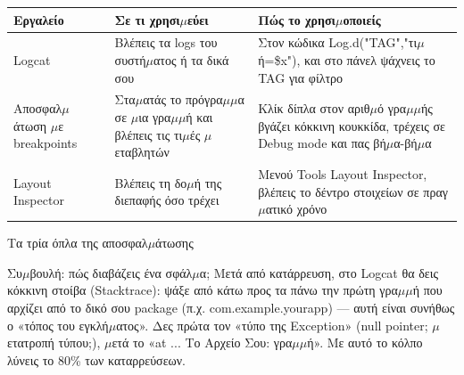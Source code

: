 


\begin{center}
\begin{tabularx}{\linewidth}{|X|X|X|}
\hline
\textbf{Εργαλείο} & \textbf{Σε τι χρησι$\mu$εύει} & \textbf{Πώς το χρησι$\mu$οποιείς} \tabularnewline
\hline
Logcat & Βλέπεις τα logs του συστή$\mu$ατος ή τα δικά σου & Στον κώδικα Log.d("TAG","τι$\mu$ή=\$x"), και στο πάνελ ψάχνεις το TAG για φίλτρο \tabularnewline
Αποσφαλ$\mu$άτωση $\mu$ε breakpoints & Στα$\mu$ατάς το πρόγρα$\mu$$\mu$α σε $\mu$ια γρα$\mu$$\mu$ή και βλέπεις τις τι$\mu$ές $\mu$εταβλητών & Κλίκ δίπλα στον αριθ$\mu$ό γρα$\mu$$\mu$ής βγάζει κόκκινη κουκκίδα, τρέχεις σε Debug mode και πας βή$\mu$α-βή$\mu$α \tabularnewline
Layout Inspector & Βλέπεις τη δο$\mu$ή της διεπαφής όσο τρέχει & Μενού Tools Layout Inspector, βλέπεις το δέντρο στοιχείων σε πραγ$\mu$ατικό χρόνο \tabularnewline
\hline
\end{tabularx}
\end{center}

\begin{center}\small\color{gray}Τα τρία όπλα της αποσφαλ$\mu$άτωσης\end{center}

\begin{tcbinfo}{Συ$\mu$βουλή: πώς διαβάζεις ένα σφάλ$\mu$α;}
Μετά από κατάρρευση, στο Logcat θα δεις κόκκινη στοίβα (Stacktrace): ψάξε από κάτω προς τα πάνω την πρώτη γρα$\mu$$\mu$ή που αρχίζει από το δικό σου package (π.χ. com.example.yourapp) — αυτή είναι συνήθως ο «τόπος του εγκλή$\mu$ατος». Δες πρώτα τον «τύπο της Exception» (null pointer; $\mu$ετατροπή τύπου;), $\mu$ετά το «at ... Το Αρχείο Σου: γρα$\mu$$\mu$ή». Με αυτό το κόλπο λύνεις το 80\% των καταρρεύσεων.

\end{tcbinfo}

